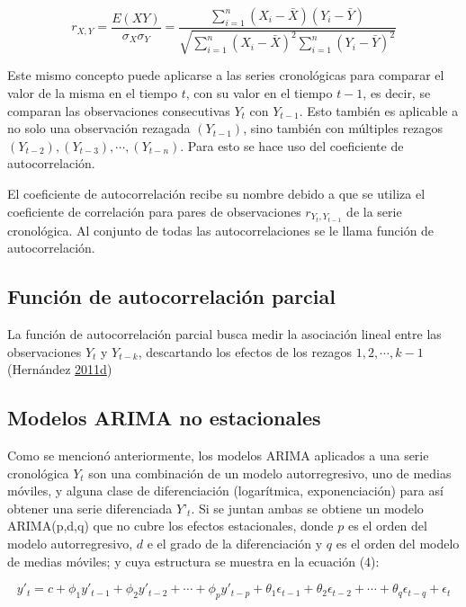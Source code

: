 \documentclass[]{article}
\begin{document}
\begin{equation}
r_{X,Y}=\frac{E(XY)}{\sigma_X \sigma_Y} = \frac{\sum_{i=1}^n \left(X_i- \bar X\right) \left(Y_i- \bar Y\right)}{\sqrt{\sum_{i=1}^n \left(X_i- \bar X\right)^2 \sum_{i=1}^n \left(Y_i- \bar Y\right)^2}}
\end{equation}

Este mismo concepto puede aplicarse a las series cronológicas para
comparar el valor de la misma en el tiempo \(t\), con su valor en el
tiempo \(t-1\), es decir, se comparan las observaciones consecutivas
\(Y_t\) con \(Y_{t-1}\). Esto también es aplicable a no solo una
observación rezagada \((Y_{t-1})\), sino también con múltiples rezagos
\((Y_{t-2}), (Y_{t-3}), \cdots,(Y_{t-n})\). Para esto se hace uso del
coeficiente de autocorrelación.

El coeficiente de autocorrelación recibe su nombre debido a que se
utiliza el coeficiente de correlación para pares de observaciones
\(r_{Y_t, Y_{t-1}}\) de la serie cronológica. Al conjunto de todas las
autocorrelaciones se le llama función de autocorrelación.

\subsection{Función de autocorrelación parcial}

La función de autocorrelación parcial busca medir la asociación lineal
entre las observaciones \(Y_t\) y \(Y_{t-k}\), descartando los efectos
de los rezagos \(1,2, \cdots ,k-1\)(Hernández
\protect\hyperlink{ref-oscarh-4}{2011}\protect\hyperlink{ref-oscarh-4}{d})

\subsection{Modelos ARIMA no estacionales}

Como se mencionó anteriormente, los modelos ARIMA aplicados a una serie
cronológica \(Y_t\) son una combinación de un modelo autorregresivo, uno
de medias móviles, y alguna clase de diferenciación (logarítmica,
exponenciación) para así obtener una serie diferenciada \(Y’_t\). Si se
juntan ambas se obtiene un modelo ARIMA(p,d,q) que no cubre los efectos
estacionales, donde \(p\) es el orden del modelo autorregresivo, \(d\) e
el grado de la diferenciación y \(q\) es el orden del modelo de medias
móviles; y cuya estructura se muestra en la ecuación (4):

\begin{equation}
y'_t=c+\phi_1y'_{t-1}+\phi_2y'_{t-2}+\cdots+\phi_py'_{t-p}+\theta_1\epsilon_{t-1}+\theta_2\epsilon_{t-2}+\cdots+\theta_q\epsilon_{t-q} +\epsilon_t
\end{equation}
\end{document}
